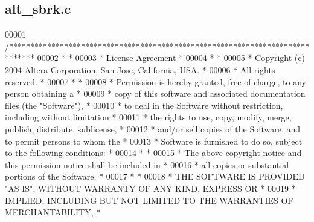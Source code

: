 \subsection{alt\+\_\+sbrk.\+c}
\label{alt__sbrk_8c_source}

\begin{DoxyCode}
00001 \textcolor{comment}{/******************************************************************************}
00002 \textcolor{comment}{*                                                                             *}
00003 \textcolor{comment}{* License Agreement                                                           *}
00004 \textcolor{comment}{*                                                                             *}
00005 \textcolor{comment}{* Copyright (c) 2004 Altera Corporation, San Jose, California, USA.           *}
00006 \textcolor{comment}{* All rights reserved.                                                        *}
00007 \textcolor{comment}{*                                                                             *}
00008 \textcolor{comment}{* Permission is hereby granted, free of charge, to any person obtaining a     *}
00009 \textcolor{comment}{* copy of this software and associated documentation files (the "Software"),  *}
00010 \textcolor{comment}{* to deal in the Software without restriction, including without limitation   *}
00011 \textcolor{comment}{* the rights to use, copy, modify, merge, publish, distribute, sublicense,    *}
00012 \textcolor{comment}{* and/or sell copies of the Software, and to permit persons to whom the       *}
00013 \textcolor{comment}{* Software is furnished to do so, subject to the following conditions:        *}
00014 \textcolor{comment}{*                                                                             *}
00015 \textcolor{comment}{* The above copyright notice and this permission notice shall be included in  *}
00016 \textcolor{comment}{* all copies or substantial portions of the Software.                         *}
00017 \textcolor{comment}{*                                                                             *}
00018 \textcolor{comment}{* THE SOFTWARE IS PROVIDED "AS IS", WITHOUT WARRANTY OF ANY KIND, EXPRESS OR  *}
00019 \textcolor{comment}{* IMPLIED, INCLUDING BUT NOT LIMITED TO THE WARRANTIES OF MERCHANTABILITY,    *}

\end{DoxyCode}
